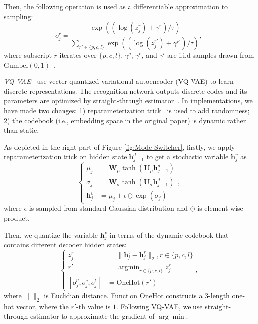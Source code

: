 \documentclass[letterpaper]{article} %
\begin{document}
	Then, the following operation is used as a differentiable approximation to sampling:
	\begin{equation}
	o_j^r = \frac{\exp((\log(z_j^r) + \gamma^r) / \tau)}{\sum_{r' \in \{p, c, l\}} \exp((\log(z_j^{r'}) + \gamma^{r'}) / \tau)},
	\end{equation}
	where subscript $r$ iterates over $\{p, c, l\}$. $\gamma^p$, $\gamma^c$, and $\gamma^l$ are i.i.d  samples drawn from $\mathrm{Gumbel}(0, 1)$~\citep{gumbel1948statistical}.

	\textit{VQ-VAE}~\citep{van2017neural} use vector-quantized variational autoencoder (VQ-VAE) to learn discrete representations. The recognition network outputs discrete codes and its parameters are optimized by straight-through estimator~\citep{bengio2013estimating}. In implementations, we have made two changes: 1) reparameterization trick~\citep{kingma2013auto} is used to add randomness; 2) the codebook (i.e., embedding space in the original paper) is dynamic rather than static.

	As depicted in the right part of Figure \ref{fig:Mode Switcher}, firstly, we apply reparameterization trick on hidden state $\mathbf{h}^d_{j-1}$ to get a stochastic variable $\mathbf{h}^v_j$ as
	\begin{equation}
	\left\{\begin{aligned}
	\mu_j & = \mathbf{W}_{\mu}\tanh(\mathbf{U}_{\mu}\mathbf{h}^d_{j-1}) \\
	\sigma_j & = \mathbf{W}_{\sigma}\tanh(\mathbf{U}_{\sigma}\mathbf{h}^d_{j-1}) \\
	\mathbf{h}^v_j & = \mu_j + \epsilon \odot \exp(\sigma_j)
	\end{aligned}\right.,
	\end{equation}
	where $\epsilon$ is sampled from standard Gaussian distribution and $\odot$ is element-wise product.

	Then, we quantize the variable $\mathbf{h}^v_j$ in terms of the dynamic codebook that contains different decoder hidden states:
	\begin{equation}
	\left\{\begin{aligned}
	z_j^r & = \| \mathbf{h}^v_j  - \mathbf{h}^r_j  \|_2, r \in \{p, c, l\} \\
	r' & = \mathop{\arg\min}_{r \in \{p, c, l\}} z_j^r \\
	[ o_j^p, o_j^c, o_j^l ] & = \mathrm{OneHot}(r')
	\end{aligned}\right.,
	\end{equation}
	where $\|\|_2$ is Euclidian distance. Function $\mathrm{OneHot}$ constructs a $3$-length one-hot vector, where the $r'$-th value is $1$. Following VQ-VAE, we use straight-through estimator to approximate the gradient of $\arg\min$.
\end{document}
